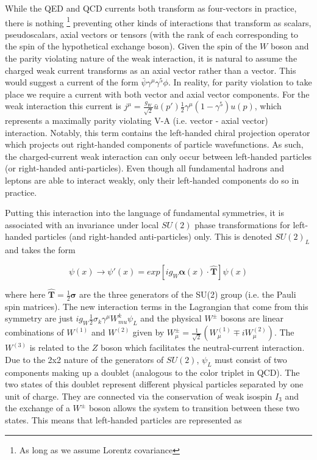 While the QED and QCD currents both transform as four-vectors in practice,  there is nothing \footnote{As long as 
we assume Lorentz covariance} preventing other kinds of interactions that transform as scalars, pseudoscalars, axial 
vectors or tensors (with the rank of each corresponding to the spin of the hypothetical exchange boson). Given the 
spin of the $W$ boson and the parity violating nature of the weak interaction, it is natural to assume the charged 
weak current transforms as an axial vector rather than a vector. This would suggest a current of the form 
$\bar{\psi}\gamma^{\mu}\gamma^{5}\phi$. In reality, for parity violation to take place we require a current with both 
vector and axial vector components. For the weak interaction this current is
$j^{\mu} = \frac{g_W}{\sqrt{2}}\bar{u}(p')\frac{1}{2}\gamma^{\mu}(1-\gamma^{5})u(p)$, which represents a 
maximally parity violating V-A (i.e. vector - axial vector) interaction. Notably, this term contains the left-handed 
chiral projection operator which projects out right-handed components of particle wavefunctions. As such,  the 
charged-current weak interaction can only occur between left-handed particles (or right-handed anti-particles). 
Even though all fundamental hadrons and leptons are able to interact weakly, only their left-handed components do 
so in practice.\par

Putting this interaction into the language of fundamental symmetries, it is associated with an invariance under 
local $SU(2)$ phase transformations for left-handed particles (and right-handed anti-particles) only. This is 
denoted $SU(2)_L$ and takes the form 

\begin{equation}
\psi(x) \rightarrow \psi'(x) = exp[ig_{W} \boldsymbol{\alpha}(x) \cdot \boldsymbol{\hat{T}}] \psi(x)
\end{equation}

where here $\boldsymbol{\hat{T}} = \frac{1}{2}\boldsymbol{\sigma}$ are the three generators of the SU(2) 
group (i.e. the Pauli spin matrices). The new interaction terms in the Lagrangian that come from this symmetry are 
just $ig_W\frac{1}{2}\sigma_k\gamma^{\mu}W_{mu}^k\psi_L$ and the physical $W^{\pm}$ bosons are linear 
combinations of $W^{(1)}$ and $W^{(2)}$ given by 
$W^{\pm}_{\mu} = \frac{1}{\sqrt{2}}(W^{(1)}_{\mu} \mp iW^{(2)}_{\mu})$. The $W^{(3)}$ is related to the $Z$ 
boson which facilitates the neutral-current interaction. Due to the 2x2 nature of the generators of $SU(2)$, 
$\psi_L$ must consist of two components making up a doublet (analogous to the color triplet in QCD). The two 
states of this doublet represent different physical particles separated by one unit of charge. They are connected 
via the conservation of weak isospin $I_3$ and the exchange of a $W^{\pm}$ boson allows the system to 
transition between these two states. This means that left-handed particles are represented as

